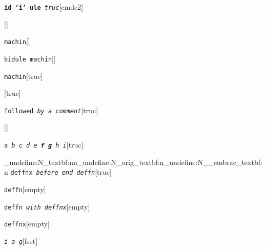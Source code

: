 \documentclass{book}
\begin{document}
%
\noindent\texttt{\textbf{id `\texttt{i}' ule} \EmbracOn{}\textnormal{\textsl{truc}}\EmbracOff{}}\hfill[cmde2]



%
\noindent\texttt{}\hfill[]



\noindent\texttt{machin}\hfill[]



%
\noindent\texttt{bidule machin}\hfill[]



%
\noindent\texttt{machin}\hfill[truc]



%
\noindent\texttt{}\hfill[truc]



\noindent\texttt{followed \EmbracOn{}\textnormal{\textsl{by a comment}}\EmbracOff{}}\hfill[truc]



%
\noindent\texttt{}\hfill[]



\noindent\texttt{a \EmbracOn{}\textnormal{\textsl{b c d e \textbf{f g} h i}}\EmbracOff{}}\hfill[truc]


\ExplSyntaxOn%
\cs_undefine:N{\embrac_textbf:nn}\cs_undefine:N{\embrac_orig_textbf:n}\cs_undefine:N{\__embrac_textbf:n}%
\ExplSyntaxOff%
%
\noindent\texttt{deffnx \EmbracOn{}\textnormal{\textsl{before end deffn}}\EmbracOff{}}\hfill[truc]



%


\noindent\texttt{deffn}\hfill[empty]



%

\noindent\texttt{deffn \EmbracOn{}\textnormal{\textsl{with deffnx}}\EmbracOff{}}\hfill[empty]



%
\noindent\texttt{deffnx}\hfill[empty]



%

\noindent\texttt{\textsl{i} \EmbracOn{}\textnormal{\textsl{a g}}\EmbracOff{}}\hfill[fset]
\end{document}
